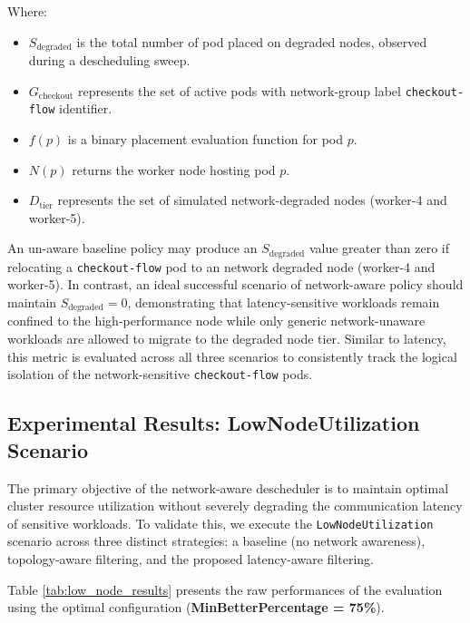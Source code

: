 \noindent Where:
\begin{itemize}
    \item \(S_{\text{degraded}}\) is the total number of pod placed on degraded nodes, observed during a descheduling sweep.

    \item \(G_{\text{checkout}}\) represents the set of active pods with network-group label \texttt{checkout-flow} identifier.

    \item \(f(p)\) is a binary placement evaluation function for pod \(p\).

    \item \(N(p)\) returns the worker node hosting pod \(p\).

    \item \(D_{\text{tier}}\) represents the set of simulated network-degraded nodes (worker-4 and worker-5).
\end{itemize}

An un-aware baseline policy may produce an \(S_{\text{degraded}}\) value greater than zero if relocating a \texttt{checkout-flow} pod to an network degraded node (worker-4 and worker-5). In contrast, an ideal successful scenario of network-aware policy should maintain \(S_{\text{degraded}} = 0\), demonstrating that latency-sensitive workloads remain confined to the high-performance node while only generic network-unaware workloads are allowed to migrate to the degraded node tier. Similar to latency, this metric is evaluated across all three scenarios to consistently track the logical isolation of the network-sensitive \texttt{checkout-flow} pods.


\subsection{Experimental Results: LowNodeUtilization Scenario}
\label{subsec:netaware4_resultanalysis1}

The primary objective of the network-aware descheduler is to maintain optimal cluster resource utilization without severely degrading the communication latency of sensitive workloads. To validate this, we execute the \texttt{LowNodeUtilization} scenario across three distinct strategies: a baseline (no network awareness), topology-aware filtering, and the proposed latency-aware filtering.

Table \ref{tab:low_node_results} presents the raw performances of the evaluation using the optimal configuration (\textbf{MinBetterPercentage = 75\%}).

